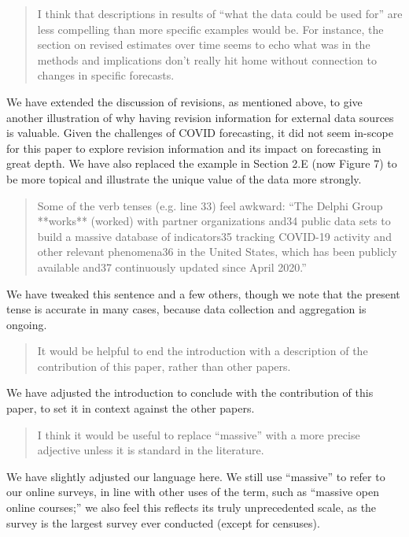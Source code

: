 \documentclass[11pt]{article}
\begin{document}
\begin{quote}
  I think that descriptions in results of ``what the data could be used for''
  are less compelling than more specific examples would be. For instance, the
  section on revised estimates over time seems to echo what was in the methods
  and implications don't really hit home without connection to changes in
  specific forecasts.
\end{quote}
We have extended the discussion of revisions, as mentioned above, to give
another illustration of why having revision information for external data
sources is valuable. Given the challenges of COVID forecasting, it did not seem
in-scope for this paper to explore revision information and its impact on
forecasting in great depth. We have also replaced the example in Section 2.E
(now Figure 7) to be more topical and illustrate the unique value of the data
more strongly.

\begin{quote}
  Some of the verb tenses (e.g. line 33) feel awkward: ``The Delphi Group
  **works** (worked) with partner organizations and34 public data sets to build
  a massive database of indicators35 tracking COVID-19 activity and other
  relevant phenomena36 in the United States, which has been publicly available
  and37 continuously updated since April 2020.''
\end{quote}
We have tweaked this sentence and a few others, though we note that the present
tense is accurate in many cases, because data collection and aggregation is
ongoing.

\begin{quote}
  It would be helpful to end the introduction with a description of the
  contribution of this paper, rather than other papers.
\end{quote}
We have adjusted the introduction to conclude with the contribution of this
paper, to set it in context against the other papers.

\begin{quote}
  I think it would be useful to replace ``massive'' with a more precise
  adjective unless it is standard in the literature.
\end{quote}
We have slightly adjusted our language here. We still use ``massive'' to refer
to our online surveys, in line with other uses of the term, such as ``massive
open online courses;'' we also feel this reflects its truly unprecedented scale,
as the survey is the largest survey ever conducted (except for censuses).
\end{document}
